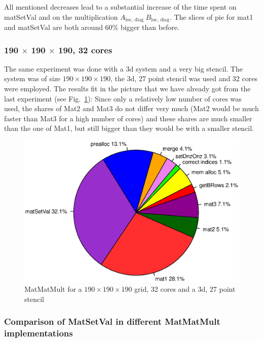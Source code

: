 All mentioned decreases lead to a substantial increase of the time spent on matSetVal and on the multiplication $A_{\textrm{loc, diag~}} B_{\textrm{loc, diag}}$. The slices of pie for mat1 and matSetVal are both around 60\% bigger than before.

\subsubsection*{190 $\times$ 190 $\times$ 190, 32 cores}
The same experiment was done with a 3d system and a very big stencil. The system was of size $190 \times 190 \times 190$, the 3d, 27 point stencil was used and 32 cores were employed. The results fit in the picture that we have already got from the last experiment (see Fig.~\ref{fig:pie_32_190}): Since only a relatively low number of cores was used, the shares of Mat2 and Mat3 do not differ very much (Mat2 would be much faster than Mat3 for a high number of cores) and these shares are much smaller than the one of Mat1, but still bigger than they would be with a smaller stencil. 

\begin{figure}[tbp]
	\centering
	\includegraphics[width=1\textwidth, trim={0 3.5cm 0 3cm},clip]{32cores_190}
	\caption{MatMatMult for a $190 \times 190 \times 190$ grid, 32 cores and a 3d, 27 point stencil} 
	\label{fig:pie_32_190}
\end{figure}

\subsubsection*{Comparison of MatSetVal in different MatMatMult implementations}

